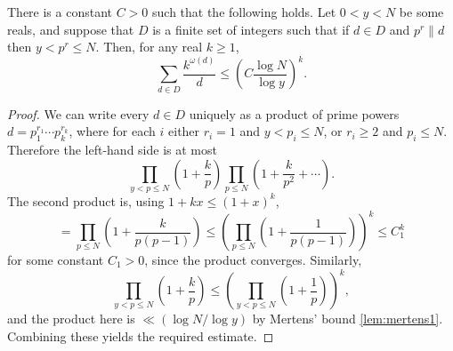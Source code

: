 \begin{lemma}\label{lem:smoothsum}
\leanok
{}
There is a constant $C>0$ such that the following holds. Let $0<y<N$ be some reals, and suppose that $D$ is a finite set of integers such that if $d\in D$ and $p^r\| d$ then $y<p^r\leq N$. Then, for any real $k\geq 1$,
\[\sum_{d\in D}\frac{k^{\omega(d)}}{d}\leq \left(C\frac{\log N}{\log y}\right)^k.\]
\end{lemma}
\begin{proof}
  \leanok
{}
We can write every $d\in D$ uniquely as a product of prime powers $d=p_1^{r_1}\cdots p_k^{r_k}$, where for each $i$ either $r_i=1$ and $y<p_i\leq N$, or $r_i\geq 2$ and $p_i\leq N$. Therefore the left-hand side is at most
\[\prod_{y<p\leq N}\left(1+\frac{k}{p}\right)\prod_{p\leq N}\left(1+\frac{k}{p^2}+\cdots\right).\]
The second product is, using $1+kx\leq (1+x)^k$,
\[=\prod_{p\leq N}\left(1+\frac{k}{p(p-1)}\right)\leq \left(\prod_{p\leq N}\left(1+\frac{1}{p(p-1)}\right)\right)^k\leq C_1^k\]
for some constant $C_1>0$, since the product converges. Similarly,
\[\prod_{y<p\leq N}\left(1+\frac{k}{p}\right)\leq \left(\prod_{y<p\leq N}\left(1+\frac{1}{p}\right)\right)^k,\]
and the product here is $\ll (\log N/\log y)$ by Mertens' bound \ref{lem:mertens1}. Combining these yields the required estimate.
\end{proof}


